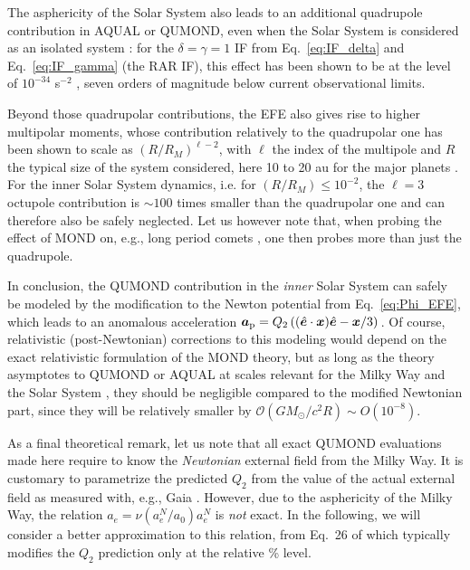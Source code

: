 \documentclass[reprint,nofootinbib,prd,aps]{revtex4-2}
\begin{document}
The asphericity of the Solar System also leads to an additional quadrupole contribution in AQUAL or QUMOND, even when the Solar System is considered as an isolated system : for the $\delta=\gamma=1$ IF from Eq.~\eqref{eq:IF_delta} and Eq.~\eqref{eq:IF_gamma} (the RAR IF), this effect has been shown to be at the level of $10^{-34}$ s$^{-2}$ \cite{Milgrom2012}, seven orders of magnitude below current observational limits. 

Beyond those quadrupolar contributions, the EFE also gives rise to higher multipolar moments, whose contribution relatively to the quadrupolar one has been shown to scale as $(R/R_M)^{\ell-2}$, with $\ell$ the index of the multipole and $R$ the typical size of the system considered, here 10 to 20 au for the major planets \cite{blanchet:2011ys}. For the inner Solar System dynamics, i.e. for  $(R/R_M)\leq 10^{-2}$, the $\ell=3$ octupole contribution is $\sim 100$ times  smaller than the quadrupolar one and can therefore also be safely neglected. Let us however note that, when probing the effect of MOND on, e.g., long period comets \cite{vokrouhlicky:2024aa}, one then probes more than just the quadrupole.

In conclusion, the QUMOND contribution in the \emph{inner} Solar System can safely be modeled by the modification to the Newton potential from Eq.~\eqref{eq:Phi_EFE}, which leads to an anomalous acceleration
$   \bm a_{\rm p} = Q_2\left((\hat{\bm e}\cdot \bm x)\hat{\bm e} - \bm x/3 \right)\,$. Of course, relativistic (post-Newtonian) corrections to this modeling would depend on the exact relativistic formulation of the MOND theory, but as long as the theory asymptotes to QUMOND or AQUAL at scales relevant for the Milky Way and the Solar System \cite{FamaeyDura}, they should be negligible compared to the modified Newtonian part, since they will be relatively smaller by $\mathcal O(GM_\odot/c^2R)\sim O\left(10^{-8}\right)$.

As a final theoretical remark, let us note that all exact QUMOND evaluations made here require to know the {\it Newtonian} external field from the Milky Way. It is customary \cite{hees:2016mi,Desmond_Cassini} to parametrize the predicted $Q_2$ from the value of the actual external field as measured with, e.g., Gaia \cite{gaia-collaboration:2021aa}. However, due to the asphericity of the Milky Way, the relation $a_e = \nu({a^N_e/a_0})a^N_e$ is {\it not} exact. In the following, we will consider a better approximation to this relation, from Eq.~26 of \cite{FamaeyDura} which typically modifies the $Q_2$ prediction only at the relative \% level.
\end{document}
